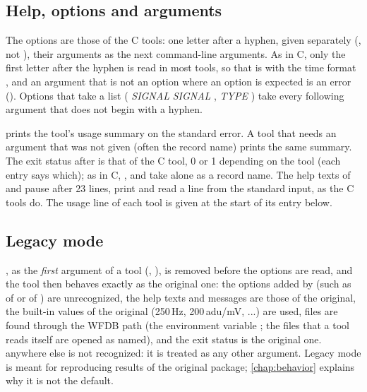 \subsection{Help, options and arguments}
\label{sec:tools-help}

The options are those of the C tools: one letter after a hyphen, given separately
(, not ), their arguments as the next command-line arguments. As in
C, only the first letter after the hyphen is read in most tools, so that  is
 with the time format , and an argument that is not an option where an
option is expected is an error (). Options that take a list
( \textit{SIGNAL} \code{[}\textit{SIGNAL} \code{...]},  \textit{TYPE} ) take
every following argument that does not begin with a hyphen.

 prints the tool's usage summary on the standard error. A tool that needs an
argument that was not given (often the record name) prints the same summary. The exit
status after  is that of the C tool, 0 or 1 depending on the tool (each entry says
which); as in C, ,  and  take  alone as a
record name. The help texts of  and  pause after 23
lines, print  and read a line from the standard input, as the C tools do. The usage
line of each tool is given at the start of its entry below.

\subsection{Legacy mode}
\label{sec:tools-legacy}

, as the \emph{first} argument of a tool (,
), is removed before the options are read, and the
tool then behaves exactly as the original one: the options added by \wfdbx{} (such as
 of  or  of ) are unrecognized, the help texts and
messages are those of the original, the built-in values of the original (250\,Hz,
200\,adu/mV, ...) are used, files are found through the WFDB path (the environment variable
; the files that a tool reads itself are opened as named), and the exit status
is the original one.  anywhere else is not
recognized: it is treated as any other argument. Legacy mode is meant for reproducing results of the original package;
\cref{chap:behavior} explains why it is not the default.

